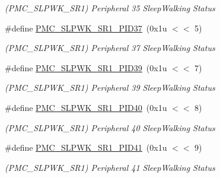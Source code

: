 \begin{DoxyCompactItemize}
\begin{DoxyCompactList}\small\item\em (P\+M\+C\+\_\+\+S\+L\+P\+W\+K\+\_\+\+S\+R1) Peripheral 35 Sleep\+Walking Status \end{DoxyCompactList}\item 
\mbox{\label{group__SAMV71__PMC_gac4237fa239f3feb2e392c03e6dc5ee25}} 
\#define \mbox{\hyperlink{group__SAMV71__PMC_gac4237fa239f3feb2e392c03e6dc5ee25}{P\+M\+C\+\_\+\+S\+L\+P\+W\+K\+\_\+\+S\+R1\+\_\+\+P\+I\+D37}}~(0x1u $<$$<$ 5)
\begin{DoxyCompactList}\small\item\em (P\+M\+C\+\_\+\+S\+L\+P\+W\+K\+\_\+\+S\+R1) Peripheral 37 Sleep\+Walking Status \end{DoxyCompactList}\item 
\mbox{\label{group__SAMV71__PMC_ga21c2dae73b4a4c28ecf39daa50391f67}} 
\#define \mbox{\hyperlink{group__SAMV71__PMC_ga21c2dae73b4a4c28ecf39daa50391f67}{P\+M\+C\+\_\+\+S\+L\+P\+W\+K\+\_\+\+S\+R1\+\_\+\+P\+I\+D39}}~(0x1u $<$$<$ 7)
\begin{DoxyCompactList}\small\item\em (P\+M\+C\+\_\+\+S\+L\+P\+W\+K\+\_\+\+S\+R1) Peripheral 39 Sleep\+Walking Status \end{DoxyCompactList}\item 
\mbox{\label{group__SAMV71__PMC_gaf6c8dbbddcffcae7dc4dfe25953829d3}} 
\#define \mbox{\hyperlink{group__SAMV71__PMC_gaf6c8dbbddcffcae7dc4dfe25953829d3}{P\+M\+C\+\_\+\+S\+L\+P\+W\+K\+\_\+\+S\+R1\+\_\+\+P\+I\+D40}}~(0x1u $<$$<$ 8)
\begin{DoxyCompactList}\small\item\em (P\+M\+C\+\_\+\+S\+L\+P\+W\+K\+\_\+\+S\+R1) Peripheral 40 Sleep\+Walking Status \end{DoxyCompactList}\item 
\mbox{\label{group__SAMV71__PMC_ga70b657db5cb6144083d30b99c43de6ee}} 
\#define \mbox{\hyperlink{group__SAMV71__PMC_ga70b657db5cb6144083d30b99c43de6ee}{P\+M\+C\+\_\+\+S\+L\+P\+W\+K\+\_\+\+S\+R1\+\_\+\+P\+I\+D41}}~(0x1u $<$$<$ 9)
\begin{DoxyCompactList}\small\item\em (P\+M\+C\+\_\+\+S\+L\+P\+W\+K\+\_\+\+S\+R1) Peripheral 41 Sleep\+Walking Status \end{DoxyCompactList}\item 

\end{DoxyCompactItemize}
